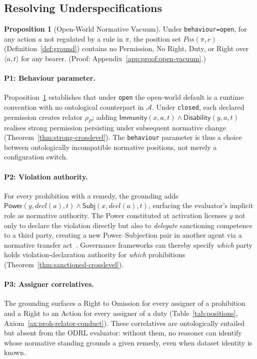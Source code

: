 \documentclass{IOS-Book-Article}
\newcommand{\Power}{\mathsf{Power}}          %
\newcommand{\Disability}{\mathsf{Disability}} %
\newcommand{\Immunity}{\mathsf{Immunity}}
\newcommand{\Subj}{\mathsf{Subj}}       %
\theoremstyle{definition}
\newtheorem{proposition}{Proposition}[section]
\begin{document}
\subsection{Resolving Underspecifications}
\label{sec:grounding:resolution}
\begin{proposition}[Open-World Normative Vacuum]
\label{prop:open-vacuum}
Under \texttt{behaviour=open}, for any action $a$ not regulated
by a rule in $\pi$, the position set $\mathit{Pos}(\pi,e)$
(Definition~\ref{def:ground}) contains no Permission,
No Right, Duty, or Right over $\langle a,t\rangle$ for any bearer.
(Proof: Appendix~\ref{app:proof:open-vacuum}.)
\end{proposition}
\paragraph{P1: Behaviour parameter.}
Proposition~\ref{prop:open-vacuum} establishes that under
\texttt{open} the open-world default is a runtime convention
with no ontological counterpart in $\mathcal{A}$.
Under \texttt{closed}, each declared permission creates relator
$\rho_P$; adding $\Immunity(x,a,t)\land\Disability(y,a,t)$
realises strong permission persisting under subsequent normative
change (Theorem~\ref{thm:strong-crosslevel}). The
\texttt{behaviour} parameter is thus a choice between
ontologically incompatible normative positions, not merely a
configuration switch.

\paragraph{P2: Violation authority.}
For every prohibition with a remedy, the grounding adds
$\Power(y,\mathit{decl}(a),t)\land\Subj(x,\mathit{decl}(a),t)$,
surfacing the evaluator's implicit role as normative authority. The Power constituted at activation licenses $y$ not only to declare the violation
directly but also to \emph{delegate} sanctioning competence to a third
party, creating a new Power--Subjection pair in another agent via a
normative transfer act~\cite{griffo2023powers}.
Governance frameworks can thereby specify \emph{which} party holds
violation-declaration authority for \emph{which} prohibitions
(Theorem~\ref{thm:sanctioned-crosslevel}).
\paragraph{P3: Assigner correlatives.}
The grounding surfaces a Right to Omission for every assigner
of a prohibition and a Right to an Action for every assigner of a
duty (Table~\ref{tab:positions}, Axiom~\ref{ax:proh-relator-conduct}).
These correlatives are ontologically entailed but absent from the
ODRL evaluator: without them, no reasoner can identify whose
normative standing grounds a given remedy, even when dataset
identity is known.
\end{document}
